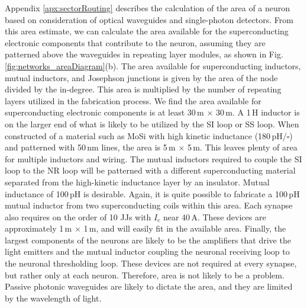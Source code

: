 \documentclass[twocolumn]{article}
\begin{document}
Appendix \ref{apx:sectorRouting} describes the calculation of the area of a neuron based on consideration of optical waveguides and single-photon detectors. From this area estimate, we can calculate the area available for the superconducting electronic components that contribute to the neuron, assuming they are patterned above the waveguides in repeating layer modules, as shown in Fig.\,\ref{fig:networks_areaDiagram}(b). The area available for superconducting inductors, mutual inductors, and Josephson junctions is given by the area of the node divided by the in-degree. This area is multiplied by the number of repeating layers utilized in the fabrication process. We find the area available for superconducting electronic components is at least 30\,\textmu m $\times$ 30\,\textmu m. A 1\,\textmu H inductor is on the larger end of what is likely to be utilized by the SI loop or SS loop. When constructed of a material such as MoSi with high kinetic inductance (180\,pH/$\square$) and patterned with 50\,nm lines, the area is 5\,\textmu m $\times$ 5\,\textmu m. This leaves plenty of area for multiple inductors and wiring. The mutual inductors required to couple the SI loop to the NR loop will be patterned with a different superconducting material separated from the high-kinetic inductance layer by an insulator. Mutual inductance of 100\,pH is desirable. Again, it is quite possible to fabricate a 100\,pH mutual inductor from two superconducting coils within this area. Each synapse also requires on the order of 10 JJs with $I_{\mathrm{c}}$ near 40\,\textmu A. These devices are approximately 1\,\textmu m $\times$ 1\,\textmu m, and will easily fit in the available area. Finally, the largest components of the neurons are likely to be the amplifiers that drive the light emitters and the mutual inductor coupling the neuronal receiving loop to the neuronal thresholding loop. These devices are not required at every synapse, but rather only at each neuron. Therefore, area is not likely to be a problem. Passive photonic waveguides are likely to dictate the area, and they are limited by the wavelength of light.
\end{document}
